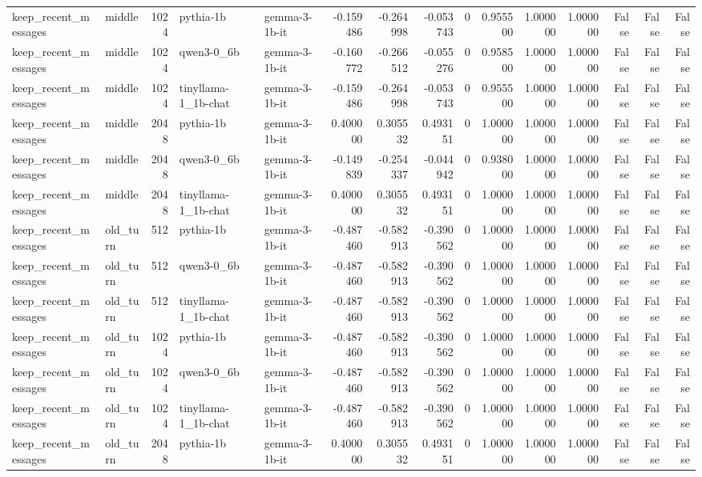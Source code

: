 \begin{tabular}{llrllrrrrrrrrrr}
keep_recent_messages & middle & 1024 & pythia-1b & gemma-3-1b-it & -0.159486 & -0.264998 & -0.053743 & 0 & 0.955500 & 1.000000 & 1.000000 & False & False & False \\
keep_recent_messages & middle & 1024 & qwen3-0_6b & gemma-3-1b-it & -0.160772 & -0.266512 & -0.055276 & 0 & 0.958500 & 1.000000 & 1.000000 & False & False & False \\
keep_recent_messages & middle & 1024 & tinyllama-1_1b-chat & gemma-3-1b-it & -0.159486 & -0.264998 & -0.053743 & 0 & 0.955500 & 1.000000 & 1.000000 & False & False & False \\
keep_recent_messages & middle & 2048 & pythia-1b & gemma-3-1b-it & 0.400000 & 0.305532 & 0.493151 & 0 & 1.000000 & 1.000000 & 1.000000 & False & False & False \\
keep_recent_messages & middle & 2048 & qwen3-0_6b & gemma-3-1b-it & -0.149839 & -0.254337 & -0.044942 & 0 & 0.938000 & 1.000000 & 1.000000 & False & False & False \\
keep_recent_messages & middle & 2048 & tinyllama-1_1b-chat & gemma-3-1b-it & 0.400000 & 0.305532 & 0.493151 & 0 & 1.000000 & 1.000000 & 1.000000 & False & False & False \\
keep_recent_messages & old_turn & 512 & pythia-1b & gemma-3-1b-it & -0.487460 & -0.582913 & -0.390562 & 0 & 1.000000 & 1.000000 & 1.000000 & False & False & False \\
keep_recent_messages & old_turn & 512 & qwen3-0_6b & gemma-3-1b-it & -0.487460 & -0.582913 & -0.390562 & 0 & 1.000000 & 1.000000 & 1.000000 & False & False & False \\
keep_recent_messages & old_turn & 512 & tinyllama-1_1b-chat & gemma-3-1b-it & -0.487460 & -0.582913 & -0.390562 & 0 & 1.000000 & 1.000000 & 1.000000 & False & False & False \\
keep_recent_messages & old_turn & 1024 & pythia-1b & gemma-3-1b-it & -0.487460 & -0.582913 & -0.390562 & 0 & 1.000000 & 1.000000 & 1.000000 & False & False & False \\
keep_recent_messages & old_turn & 1024 & qwen3-0_6b & gemma-3-1b-it & -0.487460 & -0.582913 & -0.390562 & 0 & 1.000000 & 1.000000 & 1.000000 & False & False & False \\
keep_recent_messages & old_turn & 1024 & tinyllama-1_1b-chat & gemma-3-1b-it & -0.487460 & -0.582913 & -0.390562 & 0 & 1.000000 & 1.000000 & 1.000000 & False & False & False \\
keep_recent_messages & old_turn & 2048 & pythia-1b & gemma-3-1b-it & 0.400000 & 0.305532 & 0.493151 & 0 & 1.000000 & 1.000000 & 1.000000 & False & False & False \\

\end{tabular}
